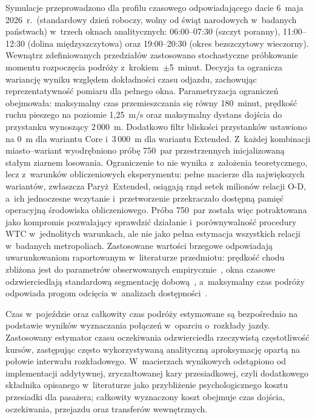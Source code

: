 \documentclass{pracamgr}
\begin{document}
Symulacje przeprowadzono dla profilu czasowego odpowiadającego dacie 6~maja 2026~r.\ (standardowy dzień roboczy, wolny od świąt narodowych w~badanych państwach) w~trzech oknach analitycznych: 06:00--07:30 (szczyt poranny), 11:00--12:30 (dolina międzyszczytowa) oraz 19:00--20:30 (okres bezszczytowy wieczorny). Wewnątrz zdefiniowanych przedziałów zastosowano stochastyczne próbkowanie momentu rozpoczęcia podróży z~krokiem~$\pm$5~minut. Decyzja ta ogranicza wariancję wyniku względem dokładności czasu odjazdu, zachowując reprezentatywność pomiaru dla pełnego okna. Parametryzacja ograniczeń obejmowała: maksymalny czas przemieszczania się równy 180~minut, prędkość ruchu pieszego na poziomie 1{,}25~m/s oraz maksymalny dystans dojścia do przystanku wynoszący 2\,000~m. Dodatkowo filtr bliskości przystanków ustawiono na 0~m dla wariantu \mbox{Core} i~3\,000~m dla wariantu \mbox{Extended}. Z~każdej kombinacji \mbox{miasto--wariant} wyodrębniono próbę 750~par przestrzennych inicjalizowaną stałym ziarnem losowania. Ograniczenie to nie wynika z~założenia teoretycznego, lecz z~warunków obliczeniowych eksperymentu: pełne macierze dla największych wariantów, zwłaszcza \mbox{Paryż~Extended}, osiągają rząd setek milionów relacji O-D, a~ich jednoczesne wczytanie i~przetworzenie przekraczało dostępną pamięć operacyjną środowiska obliczeniowego. Próba 750~par została więc potraktowana jako kompromis pozwalający sprawdzić działanie i~porównywalność procedury WTC w~jednolitych warunkach, ale nie jako pełna estymacja wszystkich relacji w~badanych metropoliach. Zastosowane wartości brzegowe odpowiadają uwarunkowaniom raportowanym w~literaturze przedmiotu: prędkość chodu zbliżona jest do parametrów obserwowanych empirycznie~\cite{metropolitan}, okna czasowe odzwierciedlają standardową segmentację dobową~\cite{literature_review,characteristics}, a~maksymalny czas podróży odpowiada progom odcięcia w~analizach dostępności~\cite{capetown,gravity2}.

Czas w~pojeździe oraz całkowity czas podróży estymowane są bezpośrednio na podstawie wyników wyznaczania połączeń w~oparciu o~rozkłady jazdy. Zastosowany estymator czasu oczekiwania odzwierciedla rzeczywistą częstotliwość kursów, zastępując często wykorzystywaną analityczną aproksymację opartą na połowie interwału rozkładowego. W~macierzach wynikowych odstąpiono od implementacji addytywnej, zryczałtowanej kary przesiadkowej, czyli dodatkowego składnika opisanego w~literaturze jako przybliżenie psychologicznego kosztu przesiadki dla pasażera; całkowity wyznaczony koszt obejmuje czas dojścia, oczekiwania, przejazdu oraz transferów wewnętrznych.
\end{document}

